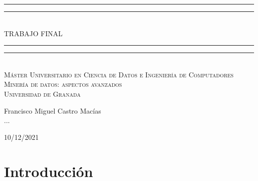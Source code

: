 \documentclass[11pt]{report}
\newlength{\drop}
\begin{document}
\begin{titlepage}
	\textheight
	\centering
	\vspace*{\baselineskip}
	\rule{\textwidth}{1.6pt}\vspace*{-\baselineskip}\vspace*{2pt}
	\rule{\textwidth}{0.4pt}\\[\baselineskip]
	{\LARGE \scshape TRABAJO FINAL}\\[0.2\baselineskip]
	\rule{\textwidth}{0.4pt}\vspace*{-\baselineskip}\vspace{3.2pt}
	\rule{\textwidth}{1.6pt}\\[\baselineskip]
	\scshape
	Máster Universitario en Ciencia de Datos e Ingeniería de Computadores \\
	Minería de datos: aspectos avanzados \\
	Universidad de Granada\par
	\vspace*{2\baselineskip}
	
	Francisco Miguel Castro Macías \\
	... \\
	\vspace*{2\baselineskip}
	{10/12/2021 \par} 
\end{titlepage}

\tableofcontents

\newpage
\chapter{Introducción}
\end{document}
